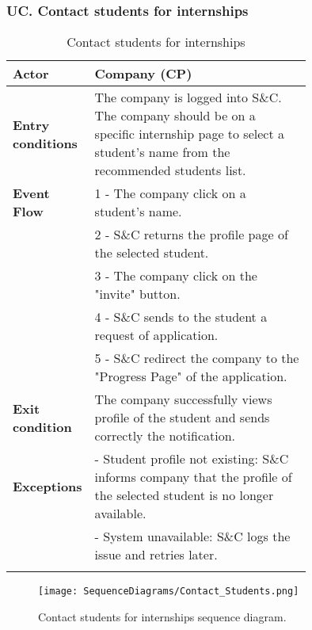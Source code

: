 \subsubsection*{UC\cuc . Contact students for internships}
\begin{center}
    \begin{longtable}{|l|p{0.75\linewidth}|}
        \hline
        \textbf{Actor}            & Company (CP)\\
        \hline
        \textbf{Entry conditions} & The company is logged into S\&C. The company should be on a specific internship page to select a student’s name from the recommended students list.\\
        \hline
        \textbf{Event Flow}     & 1 - The company click on a student's name. \\
                                & 2 - S\&C returns the profile page of the selected student. \\
                                & 3 - The company click on the "invite" button. \\
                                & 4 - S\&C sends to the student a request of application.\\
                                & 5 - S\&C redirect the company to the "Progress Page" of the application.\\
        \hline
        \textbf{Exit condition}     & The company successfully views profile of                                the student and sends correctly the notification.\\       
        \hline
        \textbf{Exceptions}     & - Student profile not existing: S\&C informs company that the profile of the selected student is no longer available. \\
                                & - System unavailable: S\&C logs the issue and retries later. \\
        \hline
        \caption{Contact students for internships}
        \label{tab: contact_students_for_internships_usecase}
    \end{longtable}
\end{center}

\begin{figure}[H]
    \begin{center}
        \texttt{[image: SequenceDiagrams/Contact\_Students.png]}
        \caption{Contact students for internships sequence diagram.}
        \label{fig:contact_students_for_internships_seqd}%
    \end{center}
\end{figure}

